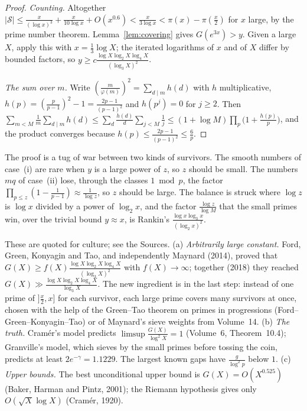 \begin{proof}
\emph{Counting.} Altogether $|\mathcal S|\le\frac x{(\log x)^3}+\frac x{10\log x}+O(x^{0.6})<\frac x{3\log x}<\pi(x)-\pi(\frac x2)$ for $x$ large, by the prime number theorem. Lemma~\ref{lem:covering} gives $G(e^{3x})>y$. Given a large $X$, apply this with $x=\frac13\log X$; the iterated logarithms of $x$ and of $X$ differ by bounded factors, so $y\ge c\frac{\log X\log_2X\log_4X}{(\log_3X)^2}$.

\emph{The sum over $m$.} Write $(\frac m{\varphi(m)})^2=\sum_{d\mid m}h(d)$ with $h$ multiplicative, $h(p)=(\frac p{p-1})^2-1=\frac{2p-1}{(p-1)^2}$ and $h(p^j)=0$ for $j\ge2$. Then $\sum_{m<M}\frac1m\sum_{d\mid m}h(d)\le\sum_d\frac{h(d)}d\sum_{j<M}\frac1j\le(1+\log M)\prod_p\bigl(1+\frac{h(p)}p\bigr)$, and the product converges because $h(p)\le\frac{2p-1}{(p-1)^2}\le\frac 6p$.
\end{proof}

The proof is a tug of war between two kinds of survivors. The smooth numbers of case~(i) are rare when $y$ is a large power of $z$, so $z$ should be small. The numbers $mq$ of case~(ii) lose, through the classes $1\bmod p$, the factor $\prod_{p\le z}(1-\frac1{p-1})\approx\frac{1}{\log z}$, so $z$ should be large. The balance is struck where $\log z$ is $\log x$ divided by a power of $\log_2x$, and the factor $\frac{\log z}{\log M}$ that the small primes win, over the trivial bound $y\approx x$, is Rankin's $\frac{\log x\log_3x}{(\log_2x)^2}$.

\begin{remark}
These are quoted for culture; see the Sources. (a) \emph{Arbitrarily large constant.} Ford, Green, Konyagin and Tao, and independently Maynard (2014), proved that $G(X)\ge f(X)\frac{\log X\log_2X\log_4X}{(\log_3X)^2}$ with $f(X)\to\infty$; together (2018) they reached $G(X)\gg\frac{\log X\log_2X\log_4X}{\log_3X}$. The new ingredient is in the last step: instead of one prime of $]\frac x2,x]$ for each survivor, each large prime covers many survivors at once, chosen with the help of the Green--Tao theorem on primes in progressions (Ford--Green--Konyagin--Tao) or of Maynard's sieve weights from Volume~14. (b) \emph{The truth.} Cramér's model predicts $\limsup\frac{G(X)}{\log^2X}=1$ (Volume~6, Theorem~10.4); Granville's model, which sieves by the small primes before tossing the coin, predicts at least $2e^{-\gamma}=1.1229$. The largest known gaps have $\frac{g}{\log^2p}$ below $1$. (c) \emph{Upper bounds.} The best unconditional upper bound is $G(X)=O(X^{0.525})$ (Baker, Harman and Pintz, 2001); the Riemann hypothesis gives only $O(\sqrt X\log X)$ (Cramér, 1920).
\end{remark}

